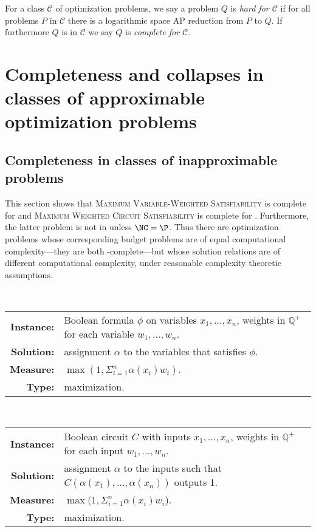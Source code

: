 \documentclass[]{article}
\begin{document}
For a class $\mathcal{C}$ of optimization problems, we say a problem $Q$ is \emph{hard for $\mathcal{C}$} if for all problems $P$ in $\mathcal{C}$ there is a logarithmic space AP reduction from $P$ to $Q$.
If furthermore $Q$ is in $\mathcal{C}$ we say $Q$ is \emph{complete for $\mathcal{C}$}.

\section{Completeness and collapses in classes of approximable optimization problems}

\subsection{Completeness in classes of inapproximable problems}

This section shows that \textsc{Maximum Variable-Weighted Satisfiability} is complete for \NNCO{} and \textsc{Maximum Weighted Circuit Satisfiability} is complete for \NPO.
Furthermore, the latter problem is not in \NNCO{} unless $\NC = \P$.
Thus there are optimization problems whose corresponding budget problems are of equal computational complexity---they are both \NP-complete---but whose solution relations are of different computational complexity, under reasonable complexity theoretic assumptions.

\begin{definition}
  \mbox{} \\
  \begin{tabular}{r p{9.5cm}}
    \textbf{Instance:} & Boolean formula $\phi$ on variables $x_1, \dotsc, x_n$, weights in $\mathbb{Q}^+$ for each variable $w_1, \dotsc, w_n$. \\
    \textbf{Solution:} & assignment $\alpha$ to the variables that satisfies $\phi$. \\
    \textbf{Measure:} & $\max(1, \Sigma_{i = 1}^n \alpha(x_i) w_i)$. \\
    \textbf{Type:} & maximization.
  \end{tabular}
\end{definition}

\begin{definition}
  \mbox{} \\
  \begin{tabular}{r p{9.5cm}}
    \textbf{Instance:} & Boolean circuit $C$ with inputs $x_1, \dotsc, x_n$, weights in $\mathbb{Q}^+$ for each input $w_1, \dotsc, w_n$. \\
    \textbf{Solution:} & assignment $\alpha$ to the inputs such that $C(\alpha(x_1), \dotsc, \alpha(x_n))$ outputs 1. \\
    \textbf{Measure:} & $\max(1, \Sigma_{i = 1}^n \alpha(x_i) w_i$). \\
    \textbf{Type:} & maximization.
  \end{tabular}
\end{definition}
\end{document}

